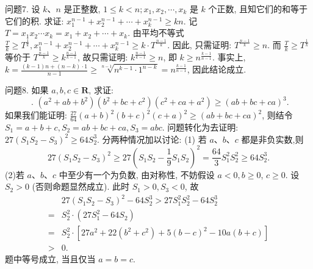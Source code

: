 问题7. 设 $k 、 n$ 是正整数, $1 \leqslant k<n ; x_1, x_2, \cdots, x_k$ 是 $k$ 个正数, 且知它们的和等于它们的积.
求证: $x_1^{n-1}+x_2^{n-1}+\cdots+x_k^{n-1} \geqslant k n$.
记 $T=x_1 x_2 \cdots x_k=x_1+x_2+\cdots+x_k$. 由平均不等式 $\frac{T}{k} \geqslant T^{\frac{1}{k}}, x_1^{n-1}+ x_2^{n-1}+\cdots+x_k^{n-1} \geqslant k \cdot T^{\frac{n-1}{k}}$. 因此, 只需证明: $T^{\frac{n-1}{k}} \geqslant n$. 而 $\frac{T}{k} \geqslant T^{\frac{1}{k}}$ 等价于 $T^{\frac{n-1}{k}} \geqslant k^{\frac{n-1}{k-1}}$, 故只需证明: $k^{\frac{n-1}{k-1}} \geqslant n$, 即 $k \geqslant n^{\frac{k-1}{n-1}}$. 事实上, $k=\frac{(k-1) n+(n-k) \cdot 1}{n-1} \geqslant \sqrt[n-1]{n^{k-1} \cdot 1^{n-k}}=n^{\frac{k-1}{n-1}}$, 因此结论成立.



问题8. 如果 $a, b, c \in \mathbf{R}$, 求证:
$$
\text { . }\left(a^2+a b+b^2\right)\left(b^2+b c+c^2\right)\left(c^2+c a+a^2\right) \geqslant(a b+b c+c a)^3 .
$$
如果我们能证明: $\frac{27}{64}(a+b)^2(b+c)^2(c+a)^2 \geqslant(a b+b c+c a)^2$, 则结令 $S_1=a+b+c, S_2=a b+b c+c a, S_3=a b c$. 问题转化为去证明: $27\left(S_1 S_2-S_3\right)^2 \geqslant 64 S_2^3$.
分两种情况加以讨论:
(1) 若 $a 、 b 、 c$ 都是非负实数,则
$$
27\left(S_1 S_2-S_3\right)^2 \geqslant 27\left(S_1 S_2-\frac{1}{9} S_1 S_2\right)^2=\frac{64}{3} S_1^2 S_2^2 \geqslant 64 S_2^3 .
$$
(2)若 $a 、 b 、 c$ 中至少有一个为负数, 由对称性, 不妨假设 $a<0, b \geqslant 0$, $c \geqslant 0$. 设 $S_2>0$ (否则命题显然成立). 此时 $S_1>0, S_3<0$, 故
$$
\begin{aligned}
& 27\left(S_1 S_2-S_3\right)^2-64 S_2^3>27 S_1^2 S_2^2-64 S_2^3 \\
= & S_2^2 \cdot\left(27 S_1^2-64 S_2\right) \\
= & S_2^2 \cdot\left[27 a^2+22\left(b^2+c^2\right)+5(b-c)^2-10 a(b+c)\right] \\
> & 0 .
\end{aligned}
$$
题中等号成立, 当且仅当 $a=b=c$.



